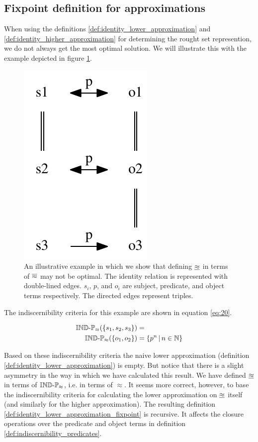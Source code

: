 \subsection{Fixpoint definition for approximations}

When using the definitions
  \ref{def:identity_lower_approximation} and
  \ref{def:identity_higher_approximation}
  for determining the rought set represention,
  we do not always get the most optimal solution.
We will illustrate this with the example depicted
  in figure \ref{fig:fixpoint}.

\begin{figure}
\label{fig:fixpoint}
\centering
\includegraphics[width=0.25\columnwidth]{./img/fixpoint_example_cropped}
\caption{
  An illustrative example in which we show that defining
  $\underline{\approx}$ in terms of $\overline{\approx}$ may not be optimal.
  The identity relation is represented with double-lined edges.
  $s_i$, $p$, and $o_i$ are subject, predicate, and object terms respectively.
  The directed edges represent triples.
}
\end{figure}

The indiscernibility criteria for this example are shown
  in equation \ref{eq:20}.

\begin{align}
\label{eq:20}
  \operatorname{{\mathbb{IND}-\mathbb{P}}}_{\approx}(\{s_1,s_2,s_3\})
&=\\
  \operatorname{{\mathbb{IND}-\mathbb{P}}}_{\approx}(\{o_1,o_2\})
&=
  \{p^n\,\vert\,n \in \mathbb{N}\}\nonumber
\end{align}

Based on these indiscernibility criteria the naive lower approximation
  (definition \ref{def:identity_lower_approximation}) is empty.
But notice that there is a slight asymmetry in the way in which we have
  calculated this result.
We have defined $\underline{\approx}$ in terms of $\operatorname{{\mathbb{IND}-\mathbb{P}}}_{\approx}$,
  i.e. in terms of $\approx$.
It seems more correct, however, to base the indiscernibility criteria
  for calculating the lower approximation on $\underline{\approx}$ itself
  (and similarly for the higher approximation).
The resulting definition \ref{def:identity_lower_approximation_fixpoint}
  is recursive.
It affects the closure operations over the predicate and object terms
  in definition \ref{def:indiscernibility_predicates}.


